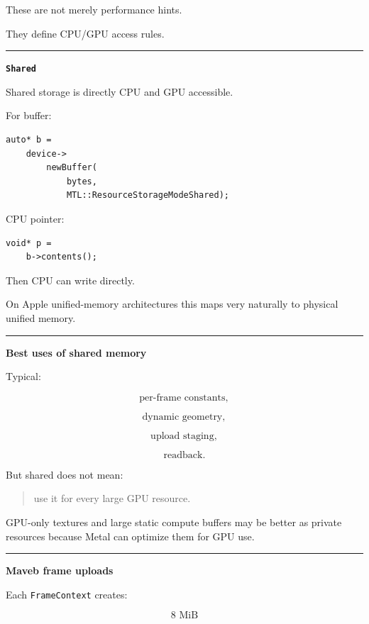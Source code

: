 These are not merely performance hints.

They define CPU/GPU access rules.

\begin{center}\rule{0.5\linewidth}{0.5pt}\end{center}

\textbf{\texttt{Shared}}

Shared storage is directly CPU and GPU accessible.

For buffer:

\begin{verbatim}
auto* b =
    device->
        newBuffer(
            bytes,
            MTL::ResourceStorageModeShared);
\end{verbatim}

CPU pointer:

\begin{verbatim}
void* p =
    b->contents();
\end{verbatim}

Then CPU can write directly.

On Apple unified-memory architectures this maps very naturally to physical unified memory.

\begin{center}\rule{0.5\linewidth}{0.5pt}\end{center}

\textbf{Best uses of shared memory}

Typical:

\[
\text{per-frame constants},
\]

\[
\text{dynamic geometry},
\]

\[
\text{upload staging},
\]

\[
\text{readback}.
\]

But shared does not mean:

\begin{quote}
use it for every large GPU resource.
\end{quote}

GPU-only textures and large static compute buffers may be better as private resources because Metal can optimize them for GPU use.

\begin{center}\rule{0.5\linewidth}{0.5pt}\end{center}

\textbf{Maveb frame uploads}

Each \texttt{FrameContext} creates:

\[
8\text{ MiB}
\]

